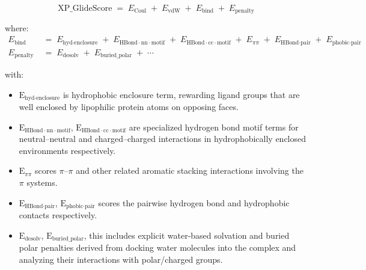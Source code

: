 \documentclass[12pt, a4paper]{article}
\begin{document}
\[
  \text{XP\_GlideScore} \;=\; E_{\text{Coul}} \;+\; E_{\text{vdW}} \;+\; E_{\text{bind}} \;+\; E_{\text{penalty}}
\]

where:
\begin{align*}
  E_{\text{bind}} \;&=\; E_{\text{hyd} \cdot \text{enclosure}} \;+\; E_{\text{HBond} \cdot \text{nn} \cdot \text{motif}} \;+\; E_{\text{HBond} \cdot \text{cc} \cdot \text{motif}} \;+\; E_{\pi\pi} \;+\; E_{\text{HBond} \cdot \text{pair}} \;+\; E_{\text{phobic} \cdot \text{pair}} \\
  E_{\text{penalty}} \;&=\; E_{\text{desolv}} \;+\; E_{\text{buried\_polar}} \;+\; \cdots
\end{align*}

with:
\begin{itemize}
  \item $\text{E}_{\text{hyd} \cdot \text{enclosure}}$ is hydrophobic enclosure term, rewarding ligand groups that are well enclosed by lipophilic protein atoms on opposing faces.
  
  \item $\text{E}_{\text{HBond} \cdot \text{nn} \cdot \text{motif}}$, $\text{E}_{\text{HBond} \cdot \text{cc} \cdot \text{motif}}$ are specialized hydrogen bond motif terms for neutral–neutral and charged–charged interactions in hydrophobically enclosed environments respectively.
  
  \item $\text{E}_{\pi\pi}$ scores $\pi$–$\pi$ and other related aromatic stacking interactions involving the $\pi$ systems.
  
  \item $\text{E}_{\text{HBond} \cdot \text{pair}}$, $\text{E}_{\text{phobic} \cdot \text{pair}}$ scores the pairwise hydrogen bond and hydrophobic contacts respectively.
  
  \item $\text{E}_{\text{desolv}}$, $\text{E}_{\text{buried\_polar}}$, this includes explicit water-based solvation and buried polar penalties derived from docking water molecules into the complex and analyzing their interactions with polar/charged groups.

\end{itemize}
\end{document}
